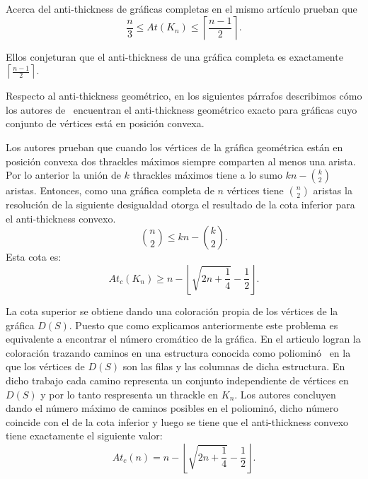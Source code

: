 Acerca del anti-thickness de gráficas completas en el mismo artículo
prueban que \[ \frac{n}{3} \leq  At(K_n) \leq \left\lceil \frac{n-1}{2} \right\rceil . \]

Ellos conjeturan que el anti-thickness de una gráfica completa es
exactamente $\left\lceil \frac{n-1}{2} \right\rceil$.

Respecto al anti-thickness geométrico, en los siguientes párrafos describimos
cómo los autores de~\cite{Fabila-Monroy2018} encuentran el anti-thickness
geométrico exacto para gráficas cuyo conjunto de vértices está en posición
convexa.

Los autores prueban que cuando los vértices de la gráfica geométrica están en
posición convexa dos thrackles máximos siempre comparten al menos una arista.
Por lo anterior la unión de $k$ thrackles máximos tiene a lo sumo $kn -
\binom{k}{2}$ aristas. Entonces, como una gráfica completa de $n$
vértices tiene $\binom{n}{2}$ aristas la resolución de la siguiente desigualdad
otorga el resultado de la cota inferior para el anti-thickness convexo.
\[ \binom{n}{2} \leq kn - \binom{k}{2} .\]
Esta cota es:
\[ At_c(K_n) \geq n - \left\lfloor \sqrt{2n + \frac{1}{4}} - \frac{1}{2} \right\rfloor. \]

La cota superior se obtiene dando una coloración propia de los vértices de la
gráfica $D(S)$. Puesto que como explicamos anteriormente este problema es
equivalente a encontrar el número cromático de la gráfica.
En el articulo logran la coloración trazando caminos en una
estructura conocida como poliominó~\cite{Fabila-Monroy2018-poly}
en la que los vértices de $D(S)$ son las filas y las columnas de dicha
estructura.
En dicho trabajo cada camino representa un conjunto independiente de vértices en
 $D(S)$ y por lo tanto respresenta un thrackle en $K_n$.
Los autores concluyen dando el número máximo de caminos posibles en el
poliominó, dicho número coincide con el de la cota inferior y luego se tiene
que el anti-thickness convexo tiene exactamente el siguiente valor:
\[ At_c(n) = n - \left\lfloor \sqrt{2n + \frac{1}{4}} - \frac{1}{2} \right\rfloor. \]

